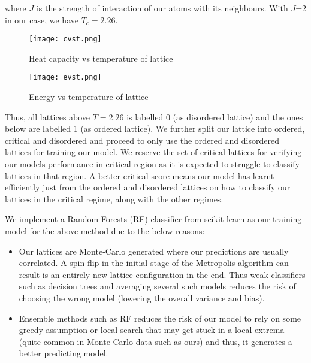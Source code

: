 where $J$ is the strength of interaction of our atoms with its neighbours. With $J$=2 in our case, we have $T_c=2.26$.

\begin{figure}[h!]
    \centering
    \texttt{[image: cvst.png]}
    \caption{Heat capacity vs temperature of lattice}
\end{figure}

\begin{figure}[h!]
    \centering
    \texttt{[image: evst.png]}
    \caption{Energy vs temperature of lattice}
\end{figure}

Thus, all lattices above $T=2.26$ is labelled 0 (as disordered lattice) and the ones below are labelled 1 (as ordered lattice).
We further split our lattice into ordered, critical and disordered and proceed to only use the ordered and disordered lattices for training our model.
We reserve the set of critical lattices for verifying our models performance in critical region as it is expected to struggle to classify lattices in that region.
A better critical score means our model has learnt efficiently just from the ordered and disordered lattices on how to classify our lattices in the critical regime, along with the other regimes.

We implement a Random Forests (RF) classifier from scikit-learn as our training model for the above method due to the below reasons:

\begin{itemize}
    \item Our lattices are Monte-Carlo generated where our predictions are usually correlated. A spin flip in the initial stage of the Metropolis algorithm can result is an entirely new lattice configuration in the end. Thus weak classifiers such as decision trees and averaging several such models reduces the risk of choosing the wrong model (lowering the overall variance and bias).
    \item Ensemble methods such as RF reduces the risk of our model to rely on some greedy assumption or local search that may get stuck in a local extrema (quite common in Monte-Carlo data such as ours) and thus, it generates a better predicting model.
\end{itemize}

